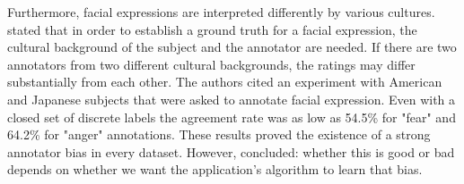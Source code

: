 \newline\newline
Furthermore, facial expressions are interpreted differently by various cultures. \citet{Salah:2018:VideoBasedER} stated that in order to establish a ground truth for a facial expression, the cultural background of the subject and the annotator are needed. If there are two annotators from two different cultural backgrounds, the ratings may differ substantially from each other. The authors \citep{Salah:2018:VideoBasedER} cited an experiment with American and Japanese subjects that were asked to annotate facial expression. Even with a closed set of discrete labels the agreement rate was as low as 54.5\% for "fear" and 64.2\% for "anger" annotations. These results proved the existence of a strong annotator bias in every dataset. However, \citet{Salah:2018:VideoBasedER} concluded: whether this is good or bad depends on whether we want the application's algorithm to learn that bias.
